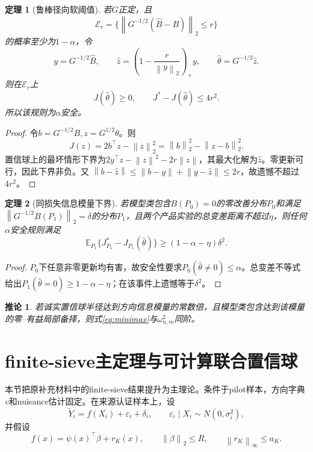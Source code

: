 \documentclass[UTF8,12pt]{ctexart}
\newtheorem{theorem}{定理}
\newtheorem{corollary}{推论}
\newcommand{\E}{\mathbb E}
\newcommand{\norm}[1]{\left\lVert #1\right\rVert}
\begin{document}
\begin{theorem}[鲁棒径向软阈值]\label{thm:soft}
若$G$正定，且
\[
\mathcal E_r=\{\norm{G^{-1/2}(\widehat B-B)}_2\le r\}
\]
的概率至少为$1-\alpha$，令
\[
y=G^{-1/2}\widehat B,\qquad
\widehat z=\left(1-\frac r{\norm y_2}\right)_+y,\qquad
\widehat\theta=G^{-1/2}\widehat z.
\]
则在$\mathcal E_r$上
\[
J(\widehat\theta)\ge0,\qquad
J^*-J(\widehat\theta)\le4r^2.
\]
所以该规则为$\alpha$安全。
\end{theorem}
\begin{proof}
令$b=G^{-1/2}B,z=G^{1/2}\theta$。则
\[
J(z)=2b^\top z-\norm z_2^2=\norm b_2^2-\norm{z-b}_2^2.
\]
置信球上的最坏情形下界为$2y^\top z-\norm z^2-2r\norm z$，其最大化解为$\widehat z$。零更新可行，因此下界非负。又
$\norm{b-\widehat z}\le\norm{b-y}+\norm{y-\widehat z}\le2r$，故遗憾不超过$4r^2$。
\end{proof}

\begin{theorem}[同损失信息模量下界]\label{thm:lower}
若模型类包含$B(P_0)=0$的零改善分布$P_0$和满足
$\norm{G^{-1/2}B(P_1)}_2=\delta$的分布$P_1$，且两个产品实验的总变差距离不超过$\eta$，则任何$\alpha$安全规则满足
\[
\E_{P_1}\{J_{P_1}^*-J_{P_1}(\widehat\theta)\}
\ge(1-\alpha-\eta)\delta^2.
\]
\end{theorem}
\begin{proof}
$P_0$下任意非零更新均有害，故安全性要求$P_0(\widehat\theta\ne0)\le\alpha$。总变差不等式给出$P_1(\widehat\theta=0)\ge1-\alpha-\eta$；在该事件上遗憾等于$\delta^2$。
\end{proof}

\begin{corollary}
若诚实置信球半径达到方向信息模量的常数倍，且模型类包含达到该模量的零--有益局部备择，则式\eqref{eq:minimax}与$\omega_{n,m}^2$同阶。
\end{corollary}

\section{finite-sieve主定理与可计算联合置信球}
本节把原补充材料中的finite-sieve结果提升为主理论。条件于pilot样本，方向字典$v$和nuisance估计固定。在来源认证样本上，设
\begin{equation}
\widetilde Y_i=f(X_i)+\varepsilon_i+\delta_i,
\qquad
\varepsilon_i\mid X_i\sim N(0,\sigma_i^2),
\label{eq:pseudo}
\end{equation}
并假设
\begin{equation}
f(x)=\psi(x)^\top\beta+r_K(x),\qquad
\norm\beta_2\le R,\qquad
\norm{r_K}_\infty\le a_K.
\label{eq:sieve}
\end{equation}
\end{document}
